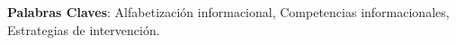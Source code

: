 \par\noindent
{\bfseries Palabras Claves\/}: Alfabetización informacional, Competencias informacionales, Estrategias de intervención.



